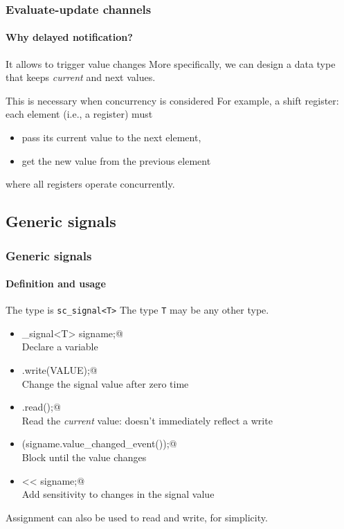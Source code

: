 \begin{frame}
\frametitle{Evaluate-update channels}
\framesubtitle{Why delayed notification?}

\begin{block}{It allows to trigger value changes}
More specifically, we can design a data type that keeps {\em current} and {next} values.
\end{block}
\pause
\begin{block}{This is necessary when concurrency is considered}
For example, a shift register: each element (i.e., a register) must
\begin{itemize}
\item pass its current value to the next element,
\item get the new value from the previous element
\end{itemize}
where all registers operate concurrently.
\end{block}
\end{frame}

\subsection{Generic signals}

\begin{frame}[fragile]
\frametitle{Generic signals}
\framesubtitle{Definition and usage}

\begin{block}{The type is \texttt{sc\_signal<T>}}
The type \texttt{T} may be any other type.
\begin{itemize}
\item \verb@sc_signal<T> signame;@ \\ Declare a variable
\item \verb@signame.write(VALUE);@ \\ Change the signal value after zero time
\item \verb@signame.read();@ \\ Read the {\em current} value: doesn't immediately reflect a write
\item \verb@wait(signame.value_changed_event());@ \\ Block until the value changes
\item \verb@sensitive << signame;@ \\ Add sensitivity to changes in the signal value
\end{itemize}
Assignment can also be used to read and write, for simplicity.
\end{block}
\end{frame}

